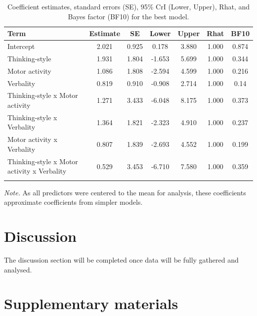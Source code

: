 \documentclass[a4paper,12pt,twoside,openright,oldfontcommands]{memoir}
\begin{document}
\begin{table}[H]
\begin{center}
\begin{threeparttable}
\caption{\label{tab:paramexp2panas}Coefficient estimates, standard errors (SE), 95\% CrI (Lower, Upper), Rhat, and Bayes factor (BF10) for the best model.}
\small{
\begin{tabular}{lcccccc}
\toprule
Term & \multicolumn{1}{c}{Estimate} & \multicolumn{1}{c}{SE} & \multicolumn{1}{c}{Lower} & \multicolumn{1}{c}{Upper} & \multicolumn{1}{c}{Rhat} & \multicolumn{1}{c}{BF10}\\
\midrule
Intercept & 2.021 & 0.925 & 0.178 & 3.880 & 1.000 & 0.874\\
Thinking-style & 1.931 & 1.804 & -1.653 & 5.699 & 1.000 & 0.344\\
Motor activity & 1.086 & 1.808 & -2.594 & 4.599 & 1.000 & 0.216\\
Verbality & 0.819 & 0.910 & -0.908 & 2.714 & 1.000 & 0.14\\
Thinking-style x Motor activity & 1.271 & 3.433 & -6.048 & 8.175 & 1.000 & 0.373\\
Thinking-style x Verbality & 1.364 & 1.821 & -2.323 & 4.910 & 1.000 & 0.237\\
Motor activity x Verbality & 0.807 & 1.839 & -2.693 & 4.552 & 1.000 & 0.199\\
Thinking-style x Motor activity x Verbality & 0.529 & 3.453 & -6.710 & 7.580 & 1.000 & 0.359\\
\bottomrule
\addlinespace
\end{tabular}
}
\begin{tablenotes}[para]
\textit{Note.} As all predictors were centered to the mean for analysis, these coefficients approximate coefficients from simpler models.
\end{tablenotes}
\end{threeparttable}
\end{center}
\end{table}

\hypertarget{discussion-4}{%
\section{Discussion}\label{discussion-4}}

The discussion section will be completed once data will be fully gathered and analysed.

\hypertarget{supp}{%
\section{Supplementary materials}\label{supp}}
\end{document}
